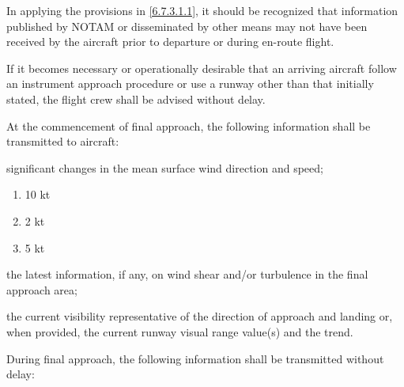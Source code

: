 \begin{enumnoss}
    \item In applying the provisions in \ref{6.7.3.1.1}, it should be recognized that information published by NOTAM or disseminated by other means may not have been received by the aircraft prior to departure or during en-route flight.
    \item If it becomes necessary or operationally desirable that an arriving aircraft follow an instrument approach procedure or use a runway other than that initially stated, the flight crew shall be advised without delay.
    \item At the commencement of final approach, the following information shall be transmitted to aircraft:

    \begin{enumalph}
        \item significant changes in the mean surface wind direction and speed;
        
        \begin{noteev}
            \begin{enumerate}[label=---,labelsep=0.4cm,leftmargin=*,labelindent=0pt]
                \item {}10 kt
                \item {}2 kt
                \item {}5 kt
            \end{enumerate}
        \end{noteev}

        \item the latest information, if any, on wind shear and/or turbulence in the final approach area;
        \item the current visibility representative of the direction of approach and landing or, when provided, the current runway visual range value(s) and the trend.
    \end{enumalph}

    \item During final approach, the following information shall be transmitted without delay:


\end{enumnoss}
